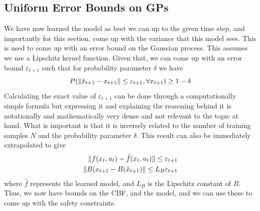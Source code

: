 \documentclass{article}
\newcommand{\eps}{\varepsilon}
\DeclarePairedDelimiter\length{\lVert}{\rVert}
\begin{document}
\subsection{Uniform Error Bounds on GPs}
We have now learned the model as best we can up to the given time step, and importantly for this section, come up with the variance that this model sees. This is used to come up with an error bound on the Gaussian process. This assumes we use a Lipschitz kernel function. Given that, we can come up with an error bound $\eps_{t + 1}$ such that for probability parameter $\delta$ we have \begin{equation}
    P(\length{\tilde{x}_{t + 1} - x_{t + 1}} \leq \eps_{t + 1}, \forall x_{t + 1}) \geq 1 - \delta
\end{equation}
Calculating the exact value of $\eps_{t + 1}$ can be done through a computationally simple formula \cite{lederer2019uniform} but expressing it and explaining the reasoning behind it is notationally and mathematically very dense and not relevant to the topic at hand. What is important is that it is inversely related to the number of training samples $N$ and the probability parameter $\delta$.
This result can also be immediately extrapolated to give 
\begin{align}
    \length{f(x_t, u_t) - \hat{f}(x_t, u_t)} \leq \eps_{t + 1}\\
    \length{B(x_{t + 1} - B(\tilde{x}_{t + 1})} \leq L_B\eps_{t+1}
\end{align} where $\hat{f}$ represents the learned model, and $L_B$ is the Lipschitz constant of $B$. Thus, we now have bounds on the CBF, and the model, and we can use these to come up with the safety constraints.
\end{document}
